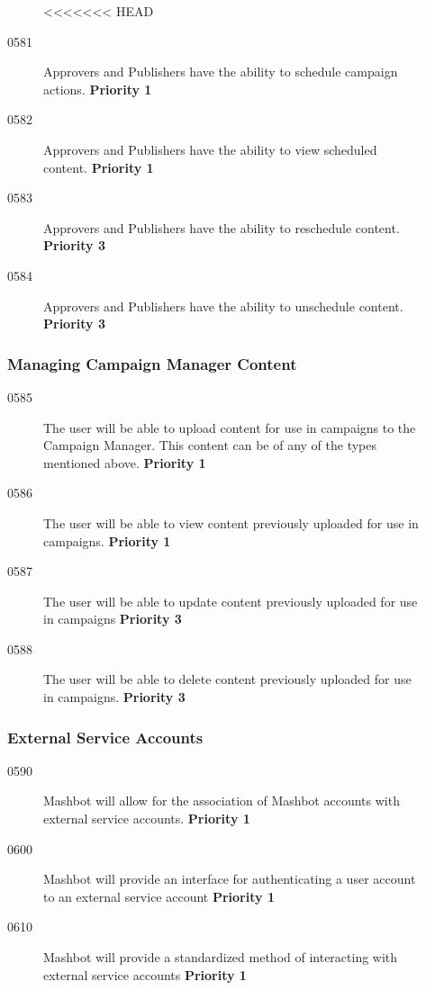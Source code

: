 \documentclass{article}
\begin{document}
\begin{description}
\begin{description}
<<<<<<< HEAD
\item[0581] Approvers and Publishers have the ability to schedule
  campaign actions. \textbf{Priority 1}
\item[0582] Approvers and Publishers have the ability to view
  scheduled content. \textbf{Priority 1}
\item[0583] Approvers and Publishers have the ability to reschedule
  content. \textbf{Priority 3}
\item[0584] Approvers and Publishers have the ability to unschedule
  content. \textbf{Priority 3}

\end{description}

\subsubsection{Managing Campaign Manager Content}

\begin{description}
\item[0585] The user will be able to upload content for use in
  campaigns to the Campaign Manager. This content can be of any of the
  types mentioned above. \textbf{Priority 1}
\item[0586] The user will be able to view content previously uploaded
  for use in campaigns. \textbf{Priority 1}
\item[0587] The user will be able to update content previously
  uploaded for use in campaigns \textbf{Priority 3}
\item[0588] The user will be able to delete content previously
  uploaded for use in campaigns. \textbf{Priority 3}

\end{description}

\subsubsection{External Service Accounts} %

\begin{description}
\item[0590] Mashbot will allow for the association of Mashbot accounts with
  external service accounts. \textbf{Priority 1}
\item[0600] Mashbot will provide an interface for authenticating a user
  account to an external service account \textbf{Priority 1}
\item[0610] Mashbot will provide a standardized method of interacting with
  external service accounts \textbf{Priority 1}
\end{description}


\end{description}
\end{document}
